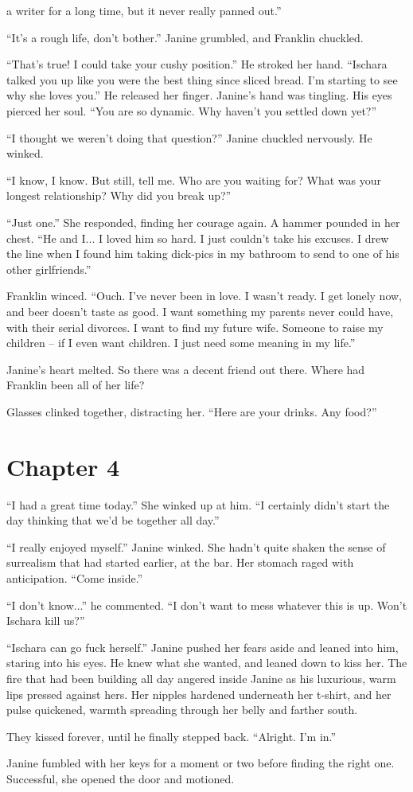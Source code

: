 a writer for a long time, but it never really panned out.'' \par ``It's a rough life, don't bother.'' Janine grumbled, and Franklin chuckled. \par ``That's true! I could take your cushy position.'' He stroked her hand. ``Ischara talked you up like you were the best thing since sliced bread. I'm starting to see why she loves you.'' He released her finger. Janine's hand was tingling. His eyes pierced her soul. ``You are so dynamic. Why haven't you settled down yet?'' \par ``I thought we weren't doing that question?'' Janine chuckled nervously. He winked. \par ``I know, I know. But still, tell me. Who are you waiting for? What was your longest relationship? Why did you break up?'' \par ``Just one.'' She responded, finding her courage again. A hammer pounded in her chest. ``He and I... I loved him so hard. I just couldn't take his excuses. I drew the line when I found him taking dick-pics in my bathroom to send to one of his other girlfriends.'' \par Franklin winced. ``Ouch. I've never been in love. I wasn't ready. I get lonely now, and beer doesn't taste as good. I want something my parents never could have, with their serial divorces. I want to find my future wife. Someone to raise my children -- if I even want children. I just need some meaning in my life.'' \par Janine's heart melted. So there was a decent friend out there. Where had Franklin been all of her life? \par Glasses clinked together, distracting her. ``Here are your drinks. Any food?'' \par \chapter{Chapter 4} \par  ``I had a great time today.'' She winked up at him. ``I certainly didn't start the day thinking that we'd be together all day.'' \par ``I really enjoyed myself.'' Janine winked. She hadn't quite shaken the sense of surrealism that had started earlier, at the bar. Her stomach raged with anticipation. ``Come inside.'' \par ``I don't know...'' he commented. ``I don't want to mess whatever this is up. Won't Ischara kill us?'' \par ``Ischara can go fuck herself.'' Janine pushed her fears aside and leaned into him, staring into his eyes. He knew what she wanted, and leaned down to kiss her. The fire that had been building all day angered inside Janine as his luxurious, warm lips pressed against hers. Her nipples hardened underneath her t-shirt, and her pulse quickened, warmth spreading through her belly and farther south. \par They kissed forever, until he finally stepped back. ``Alright. I'm in.'' \par Janine fumbled with her keys for a moment or two before finding the right one. Successful, she opened the door and motioned. 